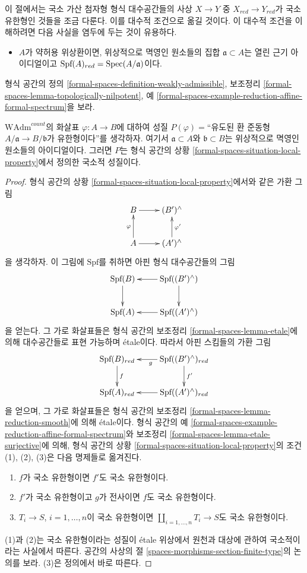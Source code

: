\noindent
이 절에서는 국소 가산 첨자형 형식 대수공간들의 사상 $X \to Y$ 중
$X_{red} \to Y_{red}$가 국소 유한형인 것들을 조금 다룬다.
이를 대수적 조건으로 옮길 것이다. 이 대수적 조건을 이해하려면
다음 사실을 염두에 두는 것이 유용하다.
\begin{itemize}
\item $A$가 약허용 위상환이면, 위상적으로 멱영인 원소들의 집합
$\mathfrak a \subset A$는 열린 근기 아이디얼이고
$\text{Spf}(A)_{red} = \mathop{\mathrm{Spec}}(A/\mathfrak a)$이다.
\end{itemize}
형식 공간의 정의 \ref{formal-spaces-definition-weakly-admissible},
보조정리 \ref{formal-spaces-lemma-topologically-nilpotent}, 예
\ref{formal-spaces-example-reduction-affine-formal-spectrum}을 보라.

\begin{lemma}
\label{lemma-finite-type-red}
$\text{WAdm}^{count}$의 화살표 $\varphi : A \to B$에 대하여
성질 $P(\varphi)=$``유도된 환 준동형
$A/\mathfrak a \to B/\mathfrak b$가 유한형이다''를 생각하자.
여기서 $\mathfrak a \subset A$와 $\mathfrak b \subset B$는
위상적으로 멱영인 원소들의 아이디얼이다. 그러면 $P$는 형식 공간의 상황
\ref{formal-spaces-situation-local-property}에서 정의한 국소적 성질이다.
\end{lemma}

\begin{proof}
형식 공간의 상황 \ref{formal-spaces-situation-local-property}에서와 같은
가환 그림
$$
\xymatrix{
B \ar[r] & (B')^\wedge \\
A \ar[r] \ar[u]^\varphi & (A')^\wedge \ar[u]_{\varphi'}
}
$$
을 생각하자. 이 그림에 $\text{Spf}$를 취하면 아핀 형식 대수공간들의 그림
$$
\xymatrix{
\text{Spf}(B) \ar[d] &
\text{Spf}((B')^\wedge) \ar[l] \ar[d] \\
\text{Spf}(A) &
\text{Spf}((A')^\wedge) \ar[l]
}
$$
을 얻는다. 그 가로 화살표들은 형식 공간의 보조정리
\ref{formal-spaces-lemma-etale}에 의해 대수공간들로 표현 가능하며 \'etale이다.
따라서 아핀 스킴들의 가환 그림
$$
\xymatrix{
\text{Spf}(B)_{red} \ar[d]^f &
\text{Spf}((B')^\wedge)_{red} \ar[l]^g \ar[d]^{f'} \\
\text{Spf}(A)_{red} &
\text{Spf}((A')^\wedge)_{red} \ar[l]
}
$$
을 얻으며, 그 가로 화살표들은 형식 공간의 보조정리
\ref{formal-spaces-lemma-reduction-smooth}에 의해 \'etale이다.
형식 공간의 예
\ref{formal-spaces-example-reduction-affine-formal-spectrum}와 보조정리
\ref{formal-spaces-lemma-etale-surjective}에 의해, 형식 공간의 상황
\ref{formal-spaces-situation-local-property}의 조건 (1), (2), (3)은
다음 명제들로 옮겨진다.
\begin{enumerate}
\item $f$가 국소 유한형이면 $f'$도 국소 유한형이다.
\item $f'$가 국소 유한형이고 $g$가 전사이면 $f$도 국소 유한형이다.
\item $T_i \to S$, $i = 1, \ldots, n$이 국소 유한형이면
$\coprod_{i = 1, \ldots, n} T_i \to S$도 국소 유한형이다.
\end{enumerate}
(1)과 (2)는 국소 유한형이라는 성질이 \'etale 위상에서
원천과 대상에 관하여 국소적이라는 사실에서 따른다.
공간의 사상의 절 \ref{spaces-morphisms-section-finite-type}의 논의를 보라.
(3)은 정의에서 바로 따른다.
\end{proof}


